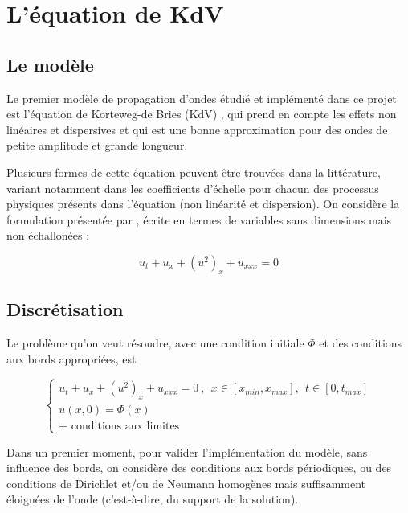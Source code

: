 \section{L'équation de KdV}
\label{sec:KdV}

\subsection{Le modèle}

\indent Le premier modèle de propagation d'ondes étudié et implémenté dans ce projet est l'équation de Korteweg-de Bries (KdV) , qui prend en compte les effets non linéaires et dispersives et qui est une bonne approximation pour des ondes de petite amplitude et grande longueur. \cite{BBM1971}

 \indent Plusieurs formes de cette équation peuvent être trouvées dans la littérature, variant notamment dans les coefficients d'échelle pour chacun des processus physiques présents dans l'équation (non linéarité et dispersion). On considère la formulation présentée par \cite{BBM1971}, écrite en termes de variables sans dimensions mais non échallonées : 

\begin{equation*}
    u_t + u_x + (u^2)_x + u_{xxx} = 0
\end{equation*}

\subsection{Discrétisation}

\indent Le problème qu'on veut résoudre, avec une condition initiale $\Phi$ et des conditions aux bords appropriées, est

\begin{equation*}
\begin{cases}
    u_t + u_x + (u^2)_x + u_{xxx} = 0 \ , \ \ x \in [x_{min},x_{max}], \ \ t \in [0, t_{max}] \\
    u(x,0) = \Phi(x) \\
    \text{+ conditions aux limites}
\end{cases}
\end{equation*}

\indent Dans un premier moment, pour valider l'implémentation du modèle, sans influence des bords, on considère des conditions aux bords périodiques, ou des conditions de Dirichlet et/ou de Neumann homogènes mais suffisamment éloignées de l'onde (c'est-à-dire, du support de la solution).

